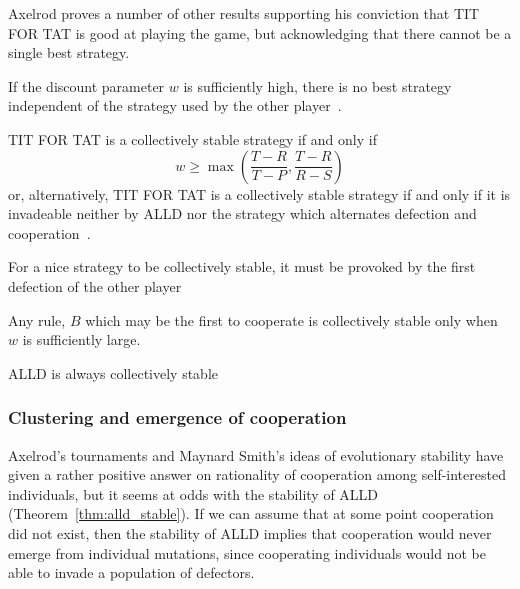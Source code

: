 Axelrod proves a number of other results supporting his conviction that TIT FOR TAT is good at playing the game, but acknowledging that there cannot be a single best strategy.

\begin{theorem}
If the discount parameter $w$ is sufficiently high, there is no best strategy independent of the strategy used by the other player~\cite[Theorem 1]{RobertAxelrod_1981}.
\end{theorem}

\begin{theorem}
TIT FOR TAT is a collectively stable strategy if and only if
\[
w \geq \max \left( \frac{T-R}{T-P}, \frac{T-R}{R-S}\right)
\]
or, alternatively, TIT FOR TAT is a collectively stable strategy if and only if it is invadeable neither by ALLD nor the strategy which alternates defection and cooperation~\cite[Theorem 2]{RobertAxelrod_1981}.
\end{theorem}

\begin{theorem}
For a nice strategy to be collectively stable, it must be provoked by the first defection of the other player~\cite[Theorem 4]{RobertAxelrod_1981}
\end{theorem}

\begin{theorem}
Any rule, $B$ which may be the first to cooperate is collectively stable only when $w$ is sufficiently large.~\cite[Theorem 5]{RobertAxelrod_1981}
\end{theorem}

\begin{theorem}\label{thm:alld_stable}
ALLD is always collectively stable~\cite[Theorem 6]{RobertAxelrod_1981}
\end{theorem}


\subsubsection{Clustering and emergence of cooperation}
Axelrod's tournaments and Maynard Smith's ideas of evolutionary stability have given a rather positive answer on rationality of cooperation among self-interested individuals, but it seems at odds with the stability of ALLD (Theorem~\ref{thm:alld_stable}). If we can assume that at some point cooperation did not exist, then the stability of ALLD implies that cooperation would never emerge from individual mutations, since cooperating individuals would not be able to invade a population of defectors.

